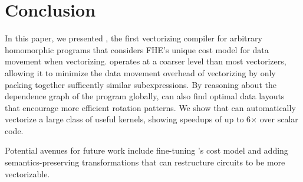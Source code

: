 \section{Conclusion}\label{sec:conclusion}
In this paper, we presented \system, the first vectorizing compiler for arbitrary homomorphic programs that considers FHE's unique cost model for data movement when vectorizing.
\system operates at a coarser level than most vectorizers, allowing it to minimize the data movement overhead of vectorizing by only packing together sufficently similar subexpressions.
By reasoning about the dependence graph of the program globally, \system can also find optimal data layouts that encourage more efficient rotation patterns.
We show that \system can automatically vectorize a large class of useful kernels, showing speedups of up to 6$\times$ over scalar code.

Potential avenues for future work include fine-tuning \system's cost model and adding semantics-preserving transformations that can restructure circuits to be more vectorizable.